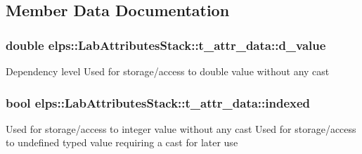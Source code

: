 \subsection{Member Data Documentation}
\hypertarget{structelps_1_1_lab_attributes_stack_1_1t__attr__data_a19980f86ba84b14f9cdddca2b041d754}{
\subsubsection[{d\+\_\+value}]{\setlength{\rightskip}{0pt plus 5cm}double elps\+::\+Lab\+Attributes\+Stack\+::t\+\_\+attr\+\_\+data\+::d\+\_\+value}}\label{structelps_1_1_lab_attributes_stack_1_1t__attr__data_a19980f86ba84b14f9cdddca2b041d754}
Dependency level Used for storage/access to double value without any cast \hypertarget{structelps_1_1_lab_attributes_stack_1_1t__attr__data_aa85d8c64cdfc9b5e62e64903efa96d7b}{
\subsubsection[{indexed}]{\setlength{\rightskip}{0pt plus 5cm}bool elps\+::\+Lab\+Attributes\+Stack\+::t\+\_\+attr\+\_\+data\+::indexed}}\label{structelps_1_1_lab_attributes_stack_1_1t__attr__data_aa85d8c64cdfc9b5e62e64903efa96d7b}
Used for storage/access to integer value without any cast Used for storage/access to undefined typed value requiring a cast for later use 